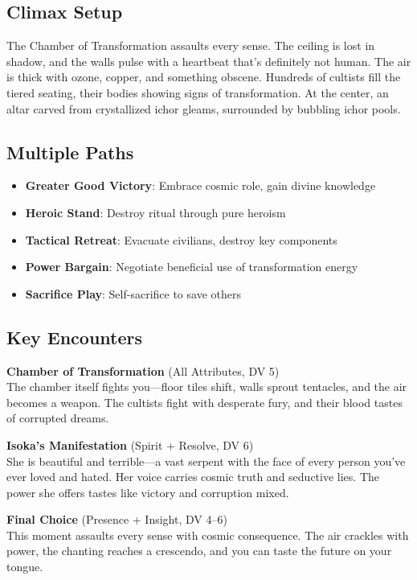 \documentclass[11pt]{article}
\begin{document}
\subsection*{Climax Setup}
The Chamber of Transformation assaults every sense. The ceiling is lost in shadow, and the walls pulse with a heartbeat that's definitely not human. The air is thick with ozone, copper, and something obscene. Hundreds of cultists fill the tiered seating, their bodies showing signs of transformation. At the center, an altar carved from crystallized ichor gleams, surrounded by bubbling ichor pools.

\subsection*{Multiple Paths}
\begin{itemize}
    \item \textbf{Greater Good Victory}: Embrace cosmic role, gain divine knowledge
    \item \textbf{Heroic Stand}: Destroy ritual through pure heroism
    \item \textbf{Tactical Retreat}: Evacuate civilians, destroy key components
    \item \textbf{Power Bargain}: Negotiate beneficial use of transformation energy
    \item \textbf{Sacrifice Play}: Self-sacrifice to save others
\end{itemize}

\subsection*{Key Encounters}

\textbf{Chamber of Transformation} (All Attributes, DV 5)\\
The chamber itself fights you—floor tiles shift, walls sprout tentacles, and the air becomes a weapon. The cultists fight with desperate fury, and their blood tastes of corrupted dreams.

\textbf{Isoka's Manifestation} (Spirit + Resolve, DV 6)\\
She is beautiful and terrible—a vast serpent with the face of every person you've ever loved and hated. Her voice carries cosmic truth and seductive lies. The power she offers tastes like victory and corruption mixed.

\textbf{Final Choice} (Presence + Insight, DV 4–6)\\
This moment assaults every sense with cosmic consequence. The air crackles with power, the chanting reaches a crescendo, and you can taste the future on your tongue.
\end{document}
